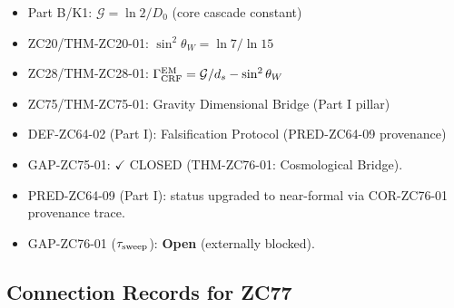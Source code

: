 \documentclass[12pt, a4paper]{article}
\begin{document}
\begin{inheritbox}[title={ZC76 --- Backward Inheritance from Parts A--I}]
\begin{itemize}[noitemsep, leftmargin=1.5em]
  \item Part B/K1: $\mathcal{G} = \ln2/D_0$ (core cascade constant)
  \item ZC20/THM-ZC20-01: $\sin^2\theta_W = \ln7/\ln15$
  \item ZC28/THM-ZC28-01: $\Gamma_{\rm CRF}^{\rm EM} = \mathcal{G}/d_s - \sin^2\theta_W$
  \item ZC75/THM-ZC75-01: Gravity Dimensional Bridge (Part I pillar)
  \item DEF-ZC64-02 (Part I): Falsification Protocol (PRED-ZC64-09 provenance)
\end{itemize}
\end{inheritbox}

\begin{correctionbox}[title={ZC76 --- Forward Corrections / Gap Closures}]
\begin{itemize}[noitemsep, leftmargin=1.5em]
  \item GAP-ZC75-01: \textcolor{crfgreen}{$\checkmark$ CLOSED}
    (THM-ZC76-01: Cosmological Bridge).
  \item PRED-ZC64-09 (Part I): status upgraded to near-formal via
    COR-ZC76-01 provenance trace.
  \item GAP-ZC76-01 ($\tau_{\rm sweep}$): \textbf{Open} (externally blocked).
\end{itemize}
\end{correctionbox}

\subsection{Connection Records for ZC77}
\end{document}
